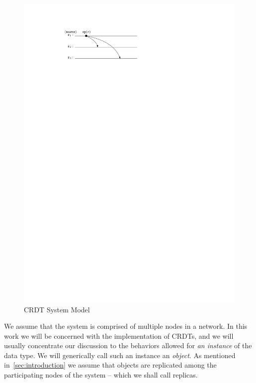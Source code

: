 \begin{figure}
  \centering
  \includegraphics[scale=.9]{figures/sys-mod}
  \caption{CRDT System Model}
  \label{fig:sys-mod}
\end{figure}

We assume that the system is comprised of multiple nodes in a network.
In this work we will be concerned with the implementation of CRDTs,
and we will usually concentrate our discussion to the behaviors
allowed for \emph{an instance} of the data type.
We will generically call such an instance an \emph{object}.
As mentioned in~\autoref{sec:introduction} we assume that objects are
replicated among the participating nodes of the system -- which we
shall call replicas.

